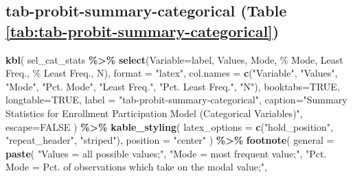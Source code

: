 \documentclass[
]{article}
\newenvironment{Shaded}{\begin{snugshade}}{\end{snugshade}}
\newcommand{\AttributeTok}[1]{\textcolor[rgb]{0.13,0.29,0.53}{#1}}
\newcommand{\ConstantTok}[1]{\textcolor[rgb]{0.56,0.35,0.01}{#1}}
\newcommand{\FunctionTok}[1]{\textcolor[rgb]{0.13,0.29,0.53}{\textbf{#1}}}
\newcommand{\NormalTok}[1]{#1}
\newcommand{\SpecialCharTok}[1]{\textcolor[rgb]{0.81,0.36,0.00}{\textbf{#1}}}
\newcommand{\StringTok}[1]{\textcolor[rgb]{0.31,0.60,0.02}{#1}}
\begin{document}
\subsection*{tab-probit-summary-categorical (Table \ref{tab:tab-probit-summary-categorical})}\label{tab-probit-summary-categorical-table-reftabtab-probit-summary-categorical}

\begin{Shaded}
\begin{Highlighting}[]
\FunctionTok{kbl}\NormalTok{(}
\NormalTok{  sel\_cat\_stats }\SpecialCharTok{\%\textgreater{}\%}
      \FunctionTok{select}\NormalTok{(}\AttributeTok{Variable=}\NormalTok{label, Values, Mode, }\StringTok{\textasciigrave{}}\AttributeTok{\% Mode}\StringTok{\textasciigrave{}}\NormalTok{, }\StringTok{\textasciigrave{}}\AttributeTok{Least Freq.}\StringTok{\textasciigrave{}}\NormalTok{, }\StringTok{\textasciigrave{}}\AttributeTok{\% Least Freq.}\StringTok{\textasciigrave{}}\NormalTok{, N),}
  \AttributeTok{format =} \StringTok{"latex"}\NormalTok{,}
  \AttributeTok{col.names =} \FunctionTok{c}\NormalTok{(}\StringTok{"Variable"}\NormalTok{, }\StringTok{"Values"}\NormalTok{, }\StringTok{"Mode"}\NormalTok{, }\StringTok{"Pct. Mode"}\NormalTok{, }\StringTok{"Least Freq."}\NormalTok{, }\StringTok{"Pct. Least Freq."}\NormalTok{, }\StringTok{"N"}\NormalTok{),}
  \AttributeTok{booktabs=}\ConstantTok{TRUE}\NormalTok{, }
  \AttributeTok{longtable=}\ConstantTok{TRUE}\NormalTok{,}
  \AttributeTok{label =} \StringTok{"tab{-}probit{-}summary{-}categorical"}\NormalTok{, }
  \AttributeTok{caption=}\StringTok{"Summary Statistics for Enrollment Participation Model (Categorical Variables)"}\NormalTok{,}
  \AttributeTok{escape=}\ConstantTok{FALSE}
\NormalTok{  ) }\SpecialCharTok{\%\textgreater{}\%}
  \FunctionTok{kable\_styling}\NormalTok{(}
    \AttributeTok{latex\_options =} \FunctionTok{c}\NormalTok{(}\StringTok{"hold\_position"}\NormalTok{, }\StringTok{"repeat\_header"}\NormalTok{, }\StringTok{"striped"}\NormalTok{),}
    \AttributeTok{position =} \StringTok{"center"}
\NormalTok{  )  }\SpecialCharTok{\%\textgreater{}\%}
  \FunctionTok{footnote}\NormalTok{(}
    \AttributeTok{general =} \FunctionTok{paste}\NormalTok{(}
      \StringTok{"\textasciigrave{}Values\textquotesingle{} = all possible values;"}\NormalTok{,}
      \StringTok{"\textasciigrave{}Mode\textquotesingle{} = most frequent value;"}\NormalTok{,}
      \StringTok{"\textasciigrave{}Pct. Mode\textquotesingle{} = Pct. of observations which take on the modal value;"}\NormalTok{,}

\end{Highlighting}
\end{Shaded}
\end{document}
